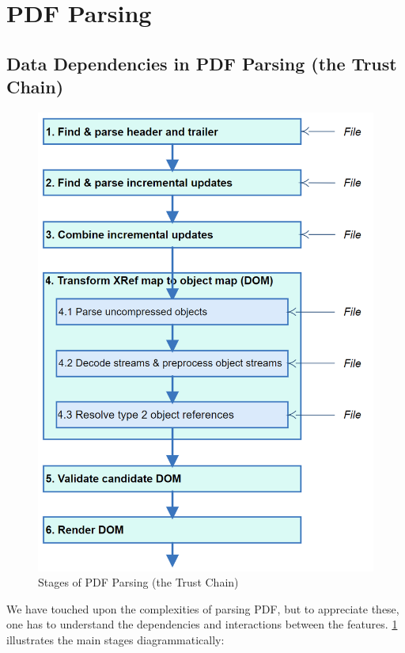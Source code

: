 \section{PDF Parsing}
\label{sec:parsing}


\subsection{Data Dependencies in PDF Parsing (the Trust Chain)}
\label{sec:trust-chain}

\begin{figure}[t]
  \centering
  \includegraphics[width=0.8\linewidth]{figures/Stages.png}
  \caption{Stages of PDF Parsing (the Trust Chain)}
  \label{fig:pdf-trust-chain}
\end{figure}

We have touched upon the complexities of parsing
PDF, but to appreciate these, one has to understand the
dependencies and interactions between the features.
\cref{fig:pdf-trust-chain} illustrates the main stages diagrammatically:

